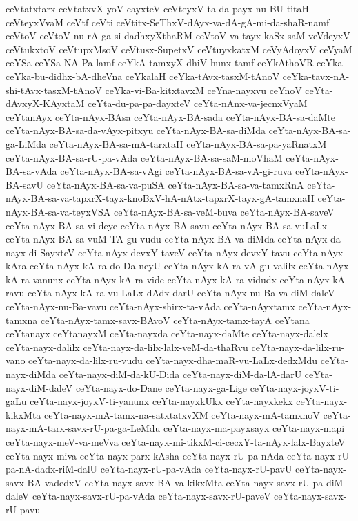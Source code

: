 {ceVtatxtarx
ceVtatxvX-yoV-cayxteV
ceVteyxV-ta-da-payx-nu-BU-titaH
ceVteyxVvaM
ceVtf
ceVti
ceVtitx-SeThxV-dAyx-va-dA-gA-mi-da-shaR-namf
ceVtoV
ceVtoV-nu-rA-ga-si-dadhxyXthaRM
ceVtoV-va-tayx-kaSx-saM-veVdeyxV
ceVtukxtoV
ceVtupxMsoV
ceVtusx-SupetxV
ceVtuyxkatxM
ceVyAdoyxV
ceVyaM
ceYSa
ceYSa-NA-Pa-lamf
ceYkA-tamxyX-dhiV-hunx-tamf
ceYkAthoVR
ceYka
ceYka-bu-didhx-bA-dheVna
ceYkalaH
ceYka-tAvx-tasxM-tAnoV
ceYka-tavx-nA-shi-tAvx-tasxM-tAnoV
ceYka-vi-Ba-kitxtavxM
ceYna-nayxvu
ceYnoV
ceYta-dAvxyX-KAyxtaM
ceYta-du-pa-pa-dayxteV
ceYta-nAnx-va-jecnxVyaM
ceYtanAyx
ceYta-nAyx-BAsa
ceYta-nAyx-BA-sada
ceYta-nAyx-BA-sa-daMte
ceYta-nAyx-BA-sa-da-vAyx-pitxyu
ceYta-nAyx-BA-sa-diMda
ceYta-nAyx-BA-sa-ga-LiMda
ceYta-nAyx-BA-sa-mA-tarxtaH
ceYta-nAyx-BA-sa-pa-yaRnatxM
ceYta-nAyx-BA-sa-rU-pa-vAda
ceYta-nAyx-BA-sa-saM-moVhaM
ceYta-nAyx-BA-sa-vAda
ceYta-nAyx-BA-sa-vAgi
ceYta-nAyx-BA-sa-vA-gi-ruva
ceYta-nAyx-BA-savU
ceYta-nAyx-BA-sa-va-puSA
ceYta-nAyx-BA-sa-va-tamxRnA
ceYta-nAyx-BA-sa-va-tapxrX-tayx-knoBxV-hA-nAtx-tapxrX-tayx-gA-tamxnaH
ceYta-nAyx-BA-sa-va-teyxVSA
ceYta-nAyx-BA-sa-veM-buva
ceYta-nAyx-BA-saveV
ceYta-nAyx-BA-sa-vi-deye
ceYta-nAyx-BA-savu
ceYta-nAyx-BA-sa-vuLaLx
ceYta-nAyx-BA-sa-vuM-TA-gu-vudu
ceYta-nAyx-BA-va-diMda
ceYta-nAyx-da-nayx-di-SayxteV
ceYta-nAyx-devxY-taveV
ceYta-nAyx-devxY-tavu
ceYta-nAyx-kAra
ceYta-nAyx-kA-ra-do-Da-neyU
ceYta-nAyx-kA-ra-vA-gu-valilx
ceYta-nAyx-kA-ra-vanunx
ceYta-nAyx-kA-ra-vide
ceYta-nAyx-kA-ra-vidudx
ceYta-nAyx-kA-ravu
ceYta-nAyx-kA-ra-vu-LaLx-dAdx-darU
ceYta-nAyx-nu-Ba-va-diM-daleV
ceYta-nAyx-nu-Ba-vavu
ceYta-nAyx-shirx-ta-vAda
ceYta-nAyxtamx
ceYta-nAyx-tamxna
ceYta-nAyx-tamx-savx-BAvoV
ceYta-nAyx-tamx-tayA
ceYtana
ceYtanayx
ceYtanayxM
ceYta-nayxda
ceYta-nayx-daMte
ceYta-nayx-dalelx
ceYta-nayx-dalilx
ceYta-nayx-da-lilx-lalx-veM-da-thaRvu
ceYta-nayx-da-lilx-ru-vano
ceYta-nayx-da-lilx-ru-vudu
ceYta-nayx-dha-maR-vu-LaLx-dedxMdu
ceYta-nayx-diMda
ceYta-nayx-diM-da-kU-Dida
ceYta-nayx-diM-da-lA-darU
ceYta-nayx-diM-daleV
ceYta-nayx-do-Dane
ceYta-nayx-ga-Lige
ceYta-nayx-joyxV-ti-gaLu
ceYta-nayx-joyxV-ti-yanunx
ceYta-nayxkUkx
ceYta-nayxkekx
ceYta-nayx-kikxMta
ceYta-nayx-mA-tamx-na-satxtatxvXM
ceYta-nayx-mA-tamxnoV
ceYta-nayx-mA-tarx-savx-rU-pa-ga-LeMdu
ceYta-nayx-ma-payxsayx
ceYta-nayx-mapi
ceYta-nayx-meV-va-meVva
ceYta-nayx-mi-tikxM-ci-cecxY-ta-nAyx-lalx-BayxteV
ceYta-nayx-miva
ceYta-nayx-parx-kAsha
ceYta-nayx-rU-pa-nAda
ceYta-nayx-rU-pa-nA-dadx-riM-dalU
ceYta-nayx-rU-pa-vAda
ceYta-nayx-rU-pavU
ceYta-nayx-savx-BA-vadedxV
ceYta-nayx-savx-BA-va-kikxMta
ceYta-nayx-savx-rU-pa-diM-daleV
ceYta-nayx-savx-rU-pa-vAda
ceYta-nayx-savx-rU-paveV
ceYta-nayx-savx-rU-pavu
}
